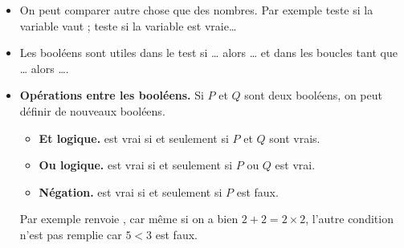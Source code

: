 \documentclass[11pt,class=report,crop=false]{standalone}
\begin{document}
\begin{cours}[Booléens]
\begin{itemize}
  \item On peut comparer autre chose que des nombres. Par exemple 
  \og{}\fg{} teste si la variable  vaut  ; \og{}\fg{} teste si la variable  est vraie\ldots
  
  \item Les booléens sont utiles dans le test \og{}si \ldots{} alors \ldots\fg{} et dans les boucles \og{}tant que \ldots{} alors \ldots\fg{}.
  
  \item \textbf{Opérations entre les booléens.}
  Si $P$ et $Q$ sont deux booléens, on peut définir de nouveaux booléens.
  \begin{itemize}
    \item \textbf{Et logique.}\quad \og{}\fg{} est vrai si et seulement si $P$ et $Q$ sont vrais.
    	\item \textbf{Ou logique.}\quad \og{}\fg{} est vrai si et seulement si $P$ ou $Q$ est vrai.
    	\item \textbf{Négation.}\quad \og{}\fg{} est vrai si et seulement si $P$ est faux.
  \end{itemize}  
  
  Par exemple \og{}\fg{} renvoie , car
  même si on a bien $2+2 = 2 \times 2$, l'autre condition n'est pas remplie car $5 < 3$ est faux.
  
  
  
\end{itemize}
\end{cours}




\end{document}
